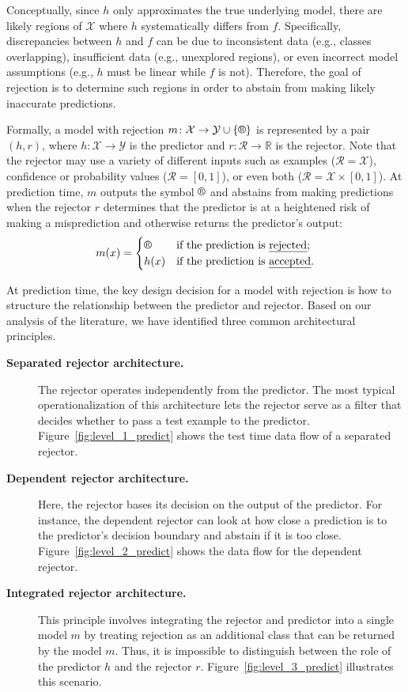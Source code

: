 Conceptually, since $h$ only approximates the true underlying model, there are likely regions of $\mathcal{X}$ where $h$ systematically differs from $f$. 
Specifically, discrepancies between $h$ and $f$ can be due to inconsistent data (e.g., classes overlapping), insufficient data (e.g., unexplored regions), or even incorrect model assumptions (e.g., $h$ must be linear while $f$ is not).
Therefore, the goal of rejection is to determine such regions in order to abstain from making likely inaccurate predictions.

Formally, a model with rejection $m \colon \mathcal{X} \to \mathcal{Y} \cup \{\rr{}\}$ is represented by a pair $(h, r)$, where $h \colon \mathcal{X} \to \mathcal{Y}$ is the predictor and $r \colon \mathcal{R} \to \mathbb{R}$ is the rejector. Note that the rejector may use a variety of different inputs such as examples ($\mathcal{R} = \mathcal{X}$), confidence or probability values ($\mathcal{R} = [0,1]$), or even both ($\mathcal{R} = \mathcal{X} \times [0,1]$).
At prediction time, $m$ outputs the symbol $\rr{}$ and abstains from making predictions when the rejector $r$ determines that the predictor is at a heightened risk of making a misprediction and otherwise returns the predictor's output:
\begin{equation}\label{eq:general_modelwithreject_equation1}
m(x) = \begin{cases}
    \rr{} &\text{if the prediction is \emph{rejected}};\\
    h(x) &\text{if the prediction is \emph{accepted}}.
\end{cases} 
\end{equation}

At prediction time, the key design decision for a model with rejection is how to structure the relationship between the predictor and rejector. Based on our analysis of the literature, we have identified three common architectural principles.
\begin{description}
\item[{\bf Separated rejector architecture.}] The rejector operates independently from the predictor. The most typical operationalization of this architecture lets the rejector serve as a filter that decides whether to pass a test example to the predictor.
Figure~\ref{fig:level_1_predict} shows the test time data flow of a separated rejector. 
\item[{\bf Dependent rejector architecture.}] Here, the rejector bases its decision on the output of the predictor. For instance, the dependent rejector can look at how close a prediction is to the predictor's decision boundary and abstain if it is too close. Figure~\ref{fig:level_2_predict} shows the data flow for the dependent rejector. 
\item[{\bf Integrated rejector architecture.}] This principle involves integrating the rejector and predictor into a single model $m$ by treating rejection as an additional class that can be returned by the model $m$. Thus, it is impossible to distinguish between the role of the predictor $h$ and the rejector $r$.
Figure~\ref{fig:level_3_predict} illustrates this scenario.
\end{description}

